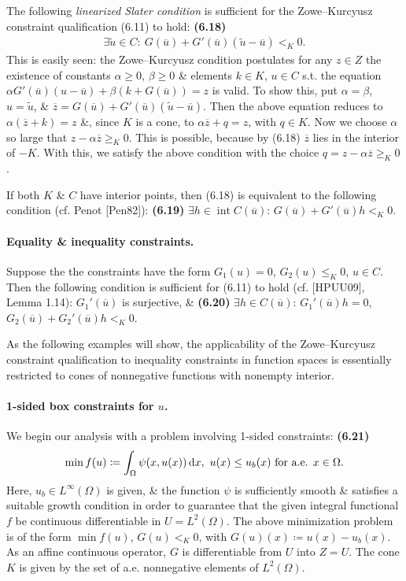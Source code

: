 \documentclass[oneside]{book}
\numberwithin{equation}{section}
\begin{document}
The following \textit{linearized Slater condition} is sufficient for the Zowe--Kurcyusz constraint qualification (6.11) to hold: \textbf{(6.18)}
\begin{align*}
	\boxed{\exists\widetilde{u}\in C:\ G(\overline{u}) + G'(\overline{u})(\widetilde{u} - \overline{u}) <_K 0.}
\end{align*}
This is easily seen: the Zowe--Kurcyusz condition postulates for any $z\in Z$ the existence of constants $\alpha\ge 0$, $\beta\ge 0$ \& elements $k\in K$, $u\in C$ s.t. the equation $\alpha G'(\overline{u})(u - \overline{u}) + \beta(k + G(\overline{u})) = z$ is valid. To show this, put $\alpha = \beta$, $u = \widetilde{u}$, \& $\overline{z} = G(\overline{u}) + G'(\overline{u})(\widetilde{u} - \overline{u})$. Then the above equation reduces to $\alpha(\overline{z} + k) = z$ \&, since $K$ is a cone, to $\alpha\overline{z} + q = z$, with $q\in K$. Now we choose $\alpha$ so large that $z - \alpha\overline{z}\ge_K 0$. This is possible, because by (6.18) $\overline{z}$ lies in the interior of $-K$. With this, we satisfy the above condition with the choice $q = z - \alpha\overline{z}\ge_K 0$.

If both $K$ \& $C$ have interior points, then (6.18) is equivalent to the following condition (cf. Penot [Pen82]): \textbf{(6.19)} $\exists h\in\operatorname{int}C(\overline{u})$: $G(\overline{u}) + G'(\overline{u})h <_K 0$.

\paragraph{Equality \& inequality constraints.} Suppose the the constraints have the form $G_1(u) = 0$, $G_2(u)\le_K 0$, $u\in C$. Then the following condition is sufficient for (6.11) to hold (cf. [HPUU09], Lemma 1.14): $G_1'(\overline{u})$ is surjective, \& \textbf{(6.20)} $\exists h\in C(\overline{u})$: $G_1'(\overline{u})h = 0$, $G_2(\overline{u}) + G_2'(\overline{u})h <_K 0$.

As the following examples will show, the applicability of the Zowe--Kurcyusz constraint qualification to inequality constraints in function spaces is essentially restricted to cones of nonnegative functions with nonempty interior.

\paragraph{1-sided box constraints for $u$.} We begin our analysis with a problem involving 1-sided constraints: \textbf{(6.21)}
\begin{align*}
	\min f(u)\coloneqq\int_\Omega \psi(x,u(x))\,{\rm d}x,\ u(x)\le u_b(x)\mbox{ for a.e. } x\in\Omega.
\end{align*}
Here, $u_b\in L^\infty(\Omega)$ is given, \& the function $\psi$ is sufficiently smooth \& satisfies a suitable growth condition in order to guarantee that the given integral functional $f$ be continuous differentiable in $U = L^2(\Omega)$. The above minimization problem is of the form $\min f(u)$, $G(u) <_K 0$, with $G(u)(x)\coloneqq u(x) - u_b(x)$. As an affine continuous operator, $G$ is differentiable from $U$ into $Z = U$. The cone $K$ is given by the set of a.e. nonnegative elements of $L^2(\Omega)$.
\end{document}
